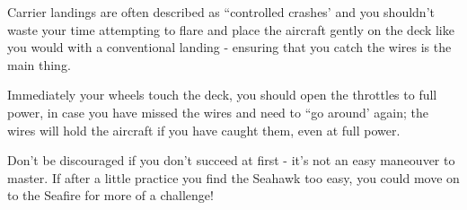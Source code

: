 Carrier landings are often described as ``controlled crashes' and you shouldn't waste your time attempting 
to flare and place the aircraft gently on the deck like you would with a conventional landing - ensuring that 
you catch the wires is the main thing.

Immediately your wheels touch the deck, you should open the throttles to full power, in case you have 
missed the wires and need to ``go around' again; the wires will hold the aircraft if you have caught them, 
even at full power.

Don't be discouraged if you don't succeed at first - it's not an easy maneouver to master. If after a little 
practice you find the Seahawk too easy, you could move on to the Seafire for more of a challenge! 

